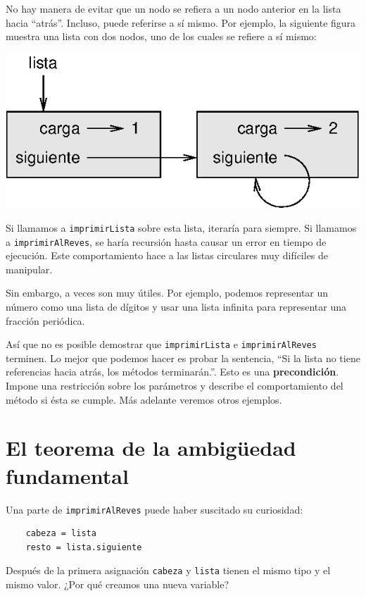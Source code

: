 No hay manera de evitar que un nodo se refiera a un nodo anterior
en la lista hacia ``atrás''. Incluso, puede referirse a sí mismo.
Por ejemplo, la siguiente figura muestra una lista con dos nodos,
uno de los cuales se refiere a sí mismo:

\beforefig
\centerline{\includegraphics{illustrations/link4.eps}}
\afterfig

Si llamamos a  \texttt{imprimirLista} sobre esta lista, iteraría para
siempre. Si llamamos a \texttt{imprimirAlReves}, se haría recursión hasta
causar un error en tiempo de ejecución. Este comportamiento hace a las
listas circulares muy difíciles de manipular.

Sin embargo, a veces son muy útiles. Por ejemplo, podemos representar un 
número como una lista de dígitos y usar una lista infinita para representar
una fracción periódica.

Así que no es posible demostrar que  \texttt{imprimirLista} e
 \texttt{imprimirAlReves} terminen.  Lo mejor que podemos hacer es probar
la sentencia, ``Si la lista no tiene referencias hacia atrás, los métodos 
terminarán.''. Esto es una {\bf precondición}. Impone una restricción 
sobre los parámetros y describe el comportamiento del método si ésta
se cumple. Más adelante veremos otros ejemplos.



\section{El teorema de la ambigüedad fundamental}

Una parte de \texttt{imprimirAlReves} puede haber suscitado su curiosidad:


\beforeverb
\begin{verbatim}
    cabeza = lista
    resto = lista.siguiente
\end{verbatim}
\afterverb
%
Después de la primera asignación  \texttt{cabeza} y \texttt{lista} tienen 
el mismo tipo y el mismo valor. ¿Por qué creamos una nueva variable?

